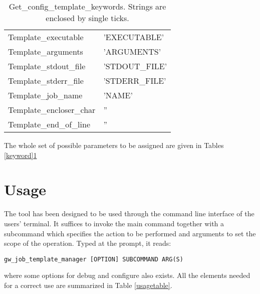 \documentclass[12pt,a4paper]{article}
\newcommand{\tab}[1]{Table \ref{#1}}
\newcommand{\tabs}[2]{Tables \ref{#1}\ref{#2}}
\begin{document}
\begin{itemize}
{\begin{table}
{\begin{tabular}{ll}
\hline
	Template\_executable & 'EXECUTABLE'\\
	Template\_arguments & 'ARGUMENTS'\\
	Template\_stdout\_file & 'STDOUT\_FILE'\\
	Template\_stderr\_file & 'STDERR\_FILE'\\
	Template\_job\_name & 'NAME'\\
	Template\_encloser\_char & ''\\
	Template\_end\_of\_line & ''\\
\hline
\end{tabular}
}
\caption{Get\_config\_template\_keywords. Strings are enclosed by single ticks.}
\label{templatekeyword}
\end{table}
The whole set of possible parameters to be assigned are given in \tabs{keyword}{templatekeyword}


\section{Usage}\label{usage}

The tool has been designed to be used through the command line interface of the users' terminal. It suffices to invoke the main command together with a subcommand which specifies the action to be performed and arguments to set the scope of the operation. Typed at the prompt, it reads:
\begin{verbatim}
gw_job_template_manager [OPTION] SUBCOMMAND ARG(S)
\end{verbatim}
where some options for debug and configure also exists. All the elements needed for a correct use are summarized in \tab{usagetable}.

}
\end{itemize}
\end{document}
